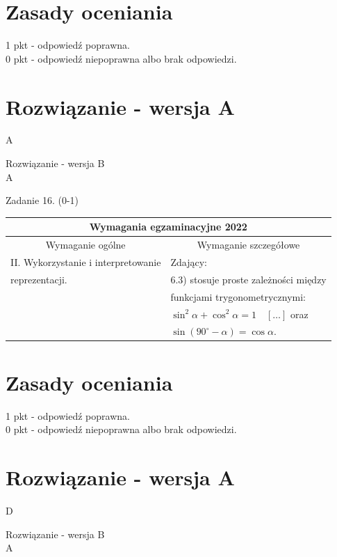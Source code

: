 \documentclass[10pt]{article}
\begin{document}
\section*{Zasady oceniania}
1 pkt - odpowiedź poprawna.\\
0 pkt - odpowiedź niepoprawna albo brak odpowiedzi.

\section*{Rozwiązanie - wersja A}
A

Rozwiązanie - wersja B\\
A

Zadanie 16. (0-1)

\begin{center}
\begin{tabular}{|l|l|}
\hline
\multicolumn{2}{|c|}{Wymagania egzaminacyjne 2022} \\
\hline
\multicolumn{1}{|c|}{Wymaganie ogólne} & \multicolumn{1}{c|}{Wymaganie szczegółowe} \\
\hline
II. Wykorzystanie i interpretowanie & Zdający: \\
reprezentacji. & 6.3) stosuje proste zależności między \\
 & funkcjami trygonometrycznymi: \\
 & $\sin ^{2} \alpha+\cos ^{2} \alpha=1 \quad[\ldots]$ oraz \\
 & $\sin \left(90^{\circ}-\alpha\right)=\cos \alpha$. \\
\hline
\end{tabular}
\end{center}

\section*{Zasady oceniania}
1 pkt - odpowiedź poprawna.\\
0 pkt - odpowiedź niepoprawna albo brak odpowiedzi.

\section*{Rozwiązanie - wersja A}
D

Rozwiązanie - wersja B\\
A
\end{document}
